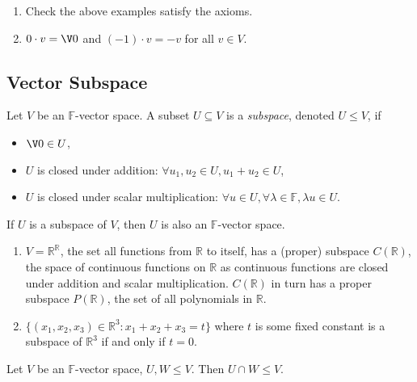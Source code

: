 \documentclass[a4paper]{article}
\theoremstyle{definition}
\begin{document}
\begin{ex}\leavevmode
  \begin{enumerate}
  \item Check the above examples satisfy the axioms.
    \item $0\cdot v = \V 0$ and $(-1)\cdot v = -v$ for all $v \in V$.
  \end{enumerate}
\end{ex}

\subsection{Vector Subspace}

\begin{defi}
  Let $V$ be an $\mathbb{F}$-vector space. A subset $U \subseteq V$ is a \emph{subspace}, denoted $U \leq V$, if
  \begin{itemize}
  \item $\V 0 \in U$,
  \item $U$ is closed under addition: $\forall u_1, u_2 \in U, u_1+u_2 \in U$,
    \item $U$ is closed under scalar multiplication: $\forall u \in U, \forall \lambda \in \mathbb{F}, \lambda u \in U$.
  \end{itemize}
\end{defi}

\begin{ex}
  If $U$ is a subspace of $V$, then $U$ is also an $\mathbb{F}$-vector space.
\end{ex}

\begin{eg}\leavevmode
  \begin{enumerate}
  \item $V = \mathbb{R}^{\mathbb{R}}$, the set all functions from $\mathbb{R}$ to itself, has a (proper) subspace $C(\mathbb{R})$, the space of continuous functions on $\mathbb{R}$ as continuous functions are closed under addition and scalar multiplication. $C(\mathbb{R})$ in turn has a proper subspace $P(\mathbb{R})$, the set of all polynomials in $\mathbb{R}$.
    \item $\{(x_1,x_2,x_3) \in \mathbb{R}^3: x_1+x_2+x_3 = t\}$ where $t$ is some fixed constant is a subspace of $\mathbb{R}^3$ if and only if $t = 0$.
  \end{enumerate}
\end{eg}

\begin{prop}
  Let $V$ be an $\mathbb{F}$-vector space, $U, W \leq V$. Then $U \cap W \leq V$.
\end{prop}
\end{document}
